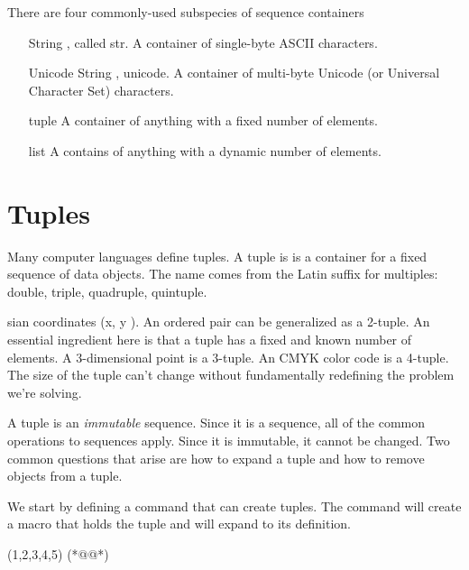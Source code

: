 \documentclass{tufte-book}
\begin{document}
There are four commonly-used subspecies of sequence containers

\begin{enumerate}
\item[String], called str. A container of single-byte ASCII characters.

\item[Unicode String], unicode. A container of multi-byte Unicode (or Universal Character Set) characters.

\item[tuple] A container of anything with a fixed number of elements.

\item[list] A contains of anything with a dynamic number of elements.
\end{enumerate}

\section{Tuples}

Many computer languages define tuples. A tuple is is a container for a fixed sequence of data objects. The name comes from the Latin suffix for
multiples: double, triple, quadruple, quintuple.

sian
coordinates (x, y ). An ordered pair can be generalized as a 2-tuple.
An essential ingredient here is that a tuple has a fixed and known number of elements. A 3-dimensional point
is a 3-tuple. An CMYK color code is a 4-tuple. The size of the tuple can’t change without fundamentally
redefining the problem we’re solving.

A tuple is an \textit{immutable} sequence. Since it is a sequence, all of the common operations
to sequences apply. Since it is immutable, it cannot be changed. Two common questions that arise are how
to expand a tuple and how to remove objects from a tuple.

We start by defining a command that can create tuples. The command will create a macro that holds the tuple and will expand to its definition.

\begin{teX}
\def\deftuple #1=(#2);{%
  \expandafter\def\csname #1\endcsname{(#2)}
}

\deftuple xy=(1,2,3,4,5);(*@@*)
\end{teX}
\def\deftuple #1=(#2);{%
  \expandafter\def\csname #1\endcsname{(#2)}
}
\end{document}
